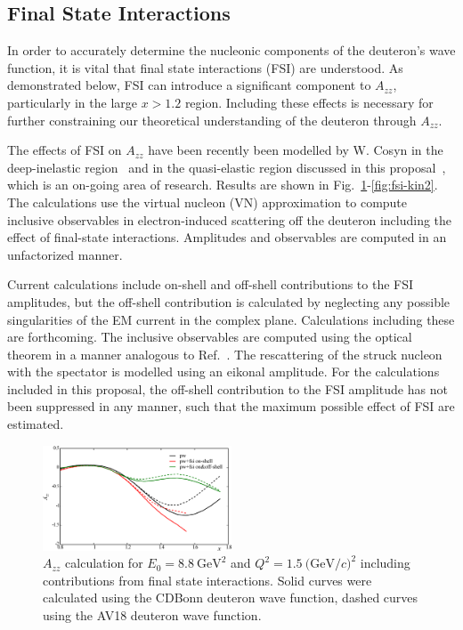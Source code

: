 
\subsection{Final State Interactions}

In order to accurately determine the nucleonic components of the deuteron's wave function, it is vital that final state interactions (FSI) are understood. As demonstrated below, FSI can introduce a significant component to $A_{zz}$, particularly in the large $x>1.2$ region. Including these effects is necessary for further constraining our theoretical understanding of the deuteron through $A_{zz}$.

The effects of FSI on $A_{zz}$ have been recently been modelled by W. Cosyn in the deep-inelastic region~\cite{Cosyn:2014sqa} and in the quasi-elastic region discussed in this proposal~\cite{cosyn-convo}, which is an on-going area of research. Results are shown in Fig.~\ref{fig:fsi-kin1}-\ref{fig:fsi-kin2}. The calculations use the virtual nucleon (VN) approximation to compute inclusive observables in electron-induced scattering off the deuteron including the 
effect of final-state interactions. Amplitudes and observables are computed in an unfactorized manner.   

Current calculations include on-shell and off-shell contributions to the FSI amplitudes, but the off-shell contribution is calculated by neglecting any  possible singularities of the EM current in the complex plane.  Calculations 
including these are forthcoming.  The inclusive observables are computed using 
the optical theorem in a manner analogous to Ref.~\cite{Cosyn:2013uoa}.  The 
rescattering of the struck nucleon with the spectator is modelled using an 
eikonal amplitude.  For the calculations included in this proposal, the off-shell 
contribution to the FSI amplitude has not been suppressed in any manner, such that the maximum possible effect of FSI are estimated.

\begin{figure}[htb]
\begin{center}
  \includegraphics[width=0.5\textwidth]{figs/kin1_cdbonn_av18.eps}
\caption{$A_{zz}$ calculation for $E_0=8.8\mathrm{~GeV}^2$ and $Q^2=1.5\mathrm{~(GeV/}c)^2$ including contributions from final state interactions.  
Solid curves were calculated using the CDBonn deuteron wave function, dashed curves using the AV18 
deuteron wave function.}
\label{fig:fsi-kin1}       %
\end{center}
\end{figure}

